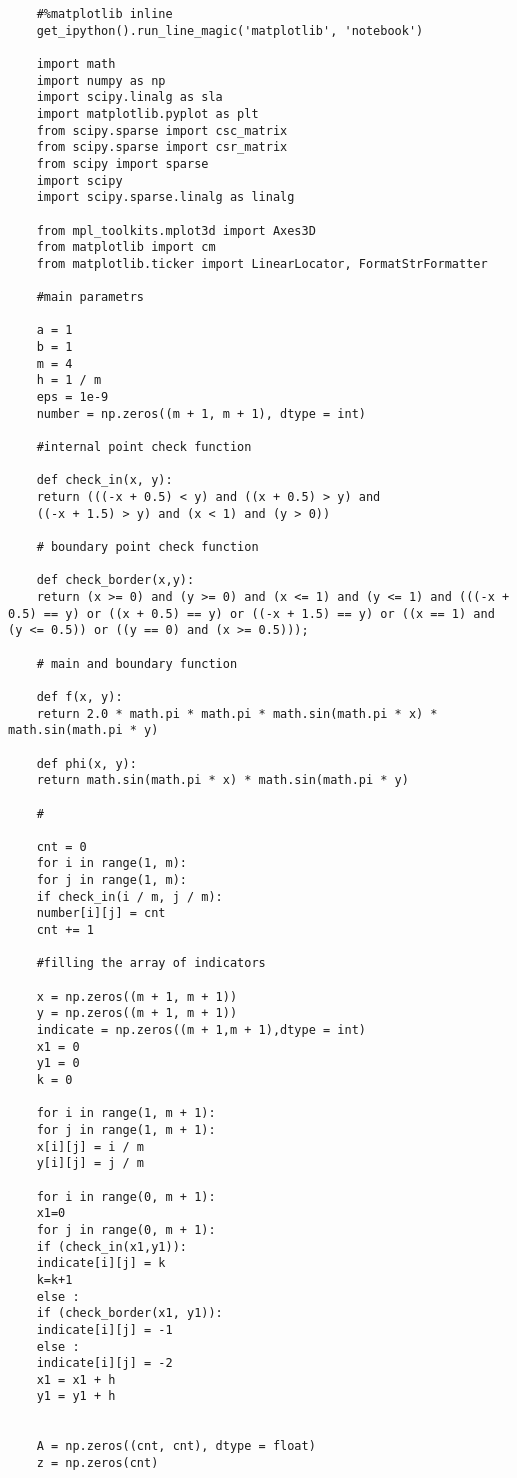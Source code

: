 	\begin{verbatim}
	#%matplotlib inline
	get_ipython().run_line_magic('matplotlib', 'notebook')
	
	import math
	import numpy as np
	import scipy.linalg as sla
	import matplotlib.pyplot as plt
	from scipy.sparse import csc_matrix
	from scipy.sparse import csr_matrix
	from scipy import sparse
	import scipy
	import scipy.sparse.linalg as linalg
	
	from mpl_toolkits.mplot3d import Axes3D
	from matplotlib import cm
	from matplotlib.ticker import LinearLocator, FormatStrFormatter
	
	#main parametrs
	
	a = 1
	b = 1
	m = 4
	h = 1 / m
	eps = 1e-9
	number = np.zeros((m + 1, m + 1), dtype = int)
	
	#internal point check function
	
	def check_in(x, y): 
	return (((-x + 0.5) < y) and ((x + 0.5) > y) and
	((-x + 1.5) > y) and (x < 1) and (y > 0))
	
	# boundary point check function
	
	def check_border(x,y):
	return (x >= 0) and (y >= 0) and (x <= 1) and (y <= 1) and (((-x + 0.5) == y) or ((x + 0.5) == y) or ((-x + 1.5) == y) or ((x == 1) and (y <= 0.5)) or ((y == 0) and (x >= 0.5)));
	
	# main and boundary function
	
	def f(x, y):
	return 2.0 * math.pi * math.pi * math.sin(math.pi * x) * math.sin(math.pi * y)
	
	def phi(x, y):
	return math.sin(math.pi * x) * math.sin(math.pi * y)
	
	#
	
	cnt = 0
	for i in range(1, m):
	for j in range(1, m):
	if check_in(i / m, j / m):
	number[i][j] = cnt
	cnt += 1
	
	#filling the array of indicators
	
	x = np.zeros((m + 1, m + 1))
	y = np.zeros((m + 1, m + 1))
	indicate = np.zeros((m + 1,m + 1),dtype = int)
	x1 = 0
	y1 = 0
	k = 0
	
	for i in range(1, m + 1):
	for j in range(1, m + 1):
	x[i][j] = i / m
	y[i][j] = j / m
	
	for i in range(0, m + 1):
	x1=0
	for j in range(0, m + 1):
	if (check_in(x1,y1)):
	indicate[i][j] = k
	k=k+1
	else :
	if (check_border(x1, y1)):
	indicate[i][j] = -1
	else :
	indicate[i][j] = -2
	x1 = x1 + h           
	y1 = y1 + h
	
	
	A = np.zeros((cnt, cnt), dtype = float)
	z = np.zeros(cnt)
	

\end{verbatim}
